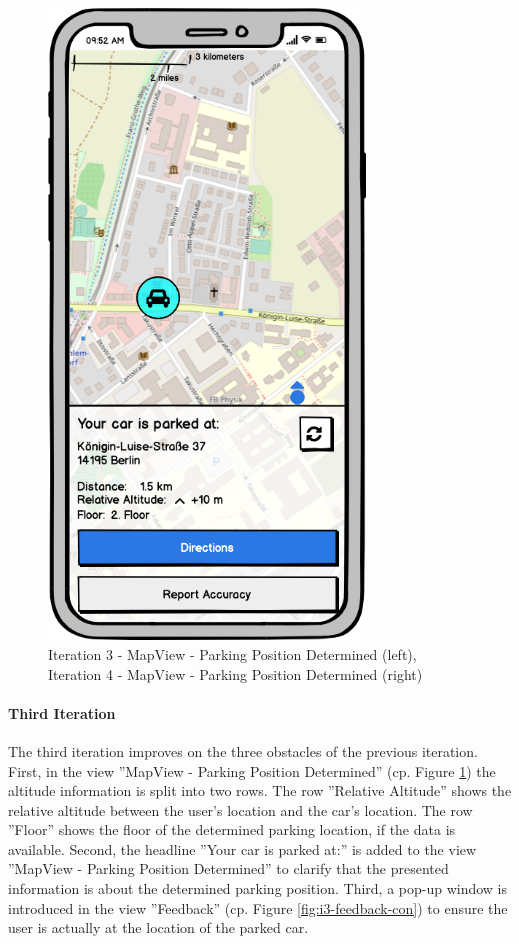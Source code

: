 \begin{figure}[h]
\begin{minipage}[b]{0.45\textwidth}
    \includegraphics[width=0.75\textwidth]{images/UI/Iteration4-MapView-ParkingPositionDetermined.png}
  \end{minipage}
  \caption{Iteration 3 - MapView - Parking Position Determined (left), Iteration 4 - MapView - Parking Position Determined (right)}
  \label{fig:i3-i4}
\end{figure}

\paragraph{Third Iteration}

The third iteration improves on the three obstacles of the previous iteration. 
First, in the view ''MapView - Parking Position Determined'' (cp. Figure \ref{fig:i3-i4}) the altitude information is split  into two rows. The row ''Relative Altitude'' shows the relative altitude between the user's location and the car's location. The row ''Floor'' shows the floor of the determined parking location, if the data is available. Second, the headline ''Your car is parked at:'' is added to the view ''MapView - Parking Position Determined'' to clarify that the presented information is about the determined parking position. Third, a pop-up window is introduced in the view ''Feedback'' (cp. Figure \ref{fig:i3-feedback-con}) to ensure the user is actually at the location of the parked car. 

